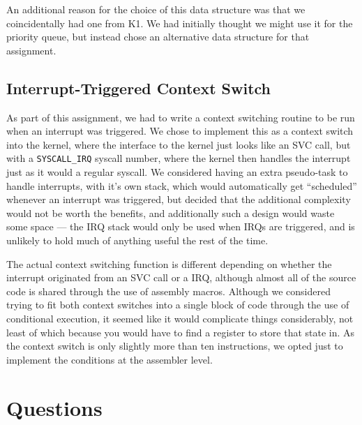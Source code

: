 \documentclass[titlepage]{article}
\begin{document}
An additional reason for the choice of this data structure was that we coincidentally
had one from K1.
We had initially thought we might use it for the priority queue,
but instead chose an alternative data structure for that assignment.

\subsection{Interrupt-Triggered Context Switch}
As part of this assignment, we had to write a context switching
routine to be run when an interrupt was triggered.
We chose to implement this as a context switch into the kernel, where the interface to the kernel just looks
like an SVC call, but with a \texttt{SYSCALL\_IRQ} syscall number, where the kernel then
handles the interrupt just as it would a regular syscall. We considered having
an extra pseudo-task to handle interrupts, with it's own stack, which would
automatically get ``scheduled'' whenever an interrupt was triggered, but decided
that the additional complexity would not be worth the benefits, and additionally
such a design would waste some space --- the IRQ stack would only be used when
IRQs are triggered, and is unlikely to hold much of anything useful the rest
of the time.

The actual context switching function is different depending on whether the
interrupt originated from an SVC call or a IRQ, although almost all of the
source code is shared through the use of assembly macros. Although we considered
trying to fit both context switches into a single block of code through the use
of conditional execution, it seemed like it would complicate things
considerably, not least of which because you would have to find a register to
store that state in. As the context switch is only slightly more than ten
instructions, we opted just to implement the conditions at the assembler level.


\section{Questions}
\end{document}
